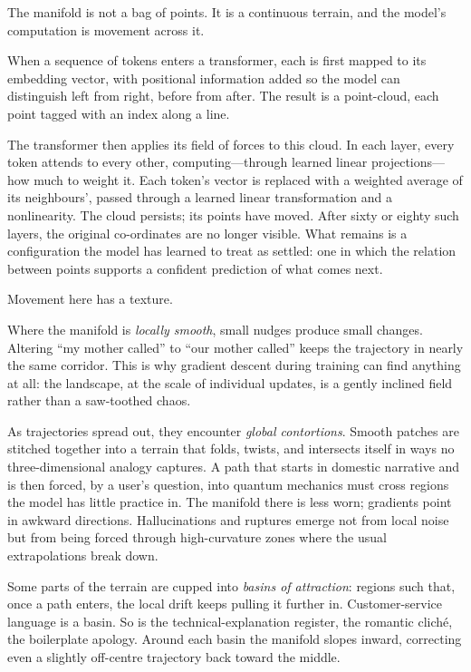 \documentclass[12pt,a4paper]{article}
\begin{document}
The manifold is not a bag of points. It is a continuous terrain, and the model's computation is movement across it.

When a sequence of tokens enters a transformer, each is first mapped to its embedding vector, with positional information added so the model can distinguish left from right, before from after. The result is a point-cloud, each point tagged with an index along a line.

The transformer then applies its field of forces to this cloud. In each layer, every token attends to every other, computing---through learned linear projections---how much to weight it. Each token's vector is replaced with a weighted average of its neighbours', passed through a learned linear transformation and a nonlinearity. The cloud persists; its points have moved. After sixty or eighty such layers, the original co-ordinates are no longer visible. What remains is a configuration the model has learned to treat as settled: one in which the relation between points supports a confident prediction of what comes next.

Movement here has a texture.

Where the manifold is \emph{locally smooth}, small nudges produce small changes. Altering ``my mother called'' to ``our mother called'' keeps the trajectory in nearly the same corridor. This is why gradient descent during training can find anything at all: the landscape, at the scale of individual updates, is a gently inclined field rather than a saw-toothed chaos.

As trajectories spread out, they encounter \emph{global contortions}. Smooth patches are stitched together into a terrain that folds, twists, and intersects itself in ways no three-dimensional analogy captures. A path that starts in domestic narrative and is then forced, by a user's question, into quantum mechanics must cross regions the model has little practice in. The manifold there is less worn; gradients point in awkward directions. Hallucinations and ruptures emerge not from local noise but from being forced through high-curvature zones where the usual extrapolations break down.

Some parts of the terrain are cupped into \emph{basins of attraction}: regions such that, once a path enters, the local drift keeps pulling it further in. Customer-service language is a basin. So is the technical-explanation register, the romantic cliché, the boilerplate apology. Around each basin the manifold slopes inward, correcting even a slightly off-centre trajectory back toward the middle.
\end{document}
